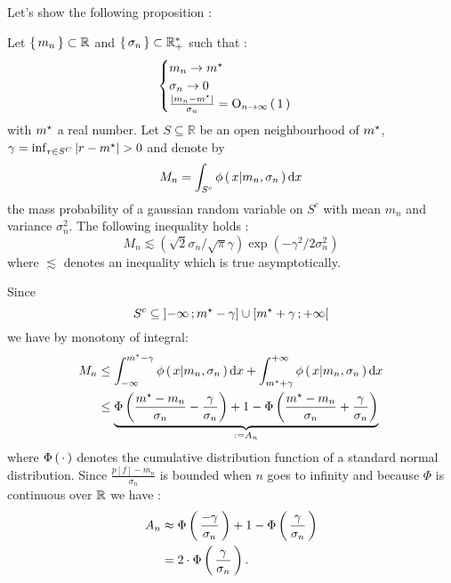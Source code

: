 Let's show the following proposition :
\begin{boxtheorem}
Let $\left \{ \, m_n \, \right \}\subset \mathbb{R}$ and $\left \{ \, \sigma_n \, \right \}\subset\mathbb{R}_{+}^{*}$ such that :
\begin{equation*}
  \begin{cases}
    m_n \rightarrow \mopt\\
    \sigma_n \rightarrow 0  \\
    \frac{\abs{m_n-\mopt}}{\sigma_n} = \O_{n\rightarrow \infty}\prt{1}
\end{cases}
\end{equation*}
with $\mopt$ a real number. Let $S \subseteq \mathbb { R }$ be an open neighbourhood of
$\mopt$, $\gamma = \inf _ { r \in S ^ { C } } | r - \mopt | > 0$ and denote by
\begin{equation*}
  M_n = \int_{S^c} \phi\left( \, x |m_n, \sigma_n \, \right) \mathop{}\mathopen{}\mathrm{d}{}x
\end{equation*}
the mass probability of a gaussian random variable on $S^c$ with mean $m_n$ and  variance $\sigma_n^2$. The following inequality holds :
 \begin{equation}
M_n \lesssim \left( \sqrt { 2 } \sigma _ { n } / \sqrt { \pi } \gamma \right) \exp \left( - \gamma ^ { 2 } / 2 \sigma _ { n } ^ { 2 } \right)
 \end{equation}
 where $\lesssim$ denotes an inequality which is true asymptotically.
\end{boxtheorem}

\noindent
Since $$S^c \subseteq \intof{-\infty}{\mopt-\gamma} \cup \intfo{\mopt+\gamma}{+\infty}$$
we have by monotony of integral:
\begin{align*}
  M_n &\leq \int_{-\infty}^{\mopt-\gamma}\phi\prt{x |m_n, \sigma_n} \dx
  + \int_{\mopt+\gamma}^{+\infty}\phi\prt{x |m_n, \sigma_n} \dx\\
  &\leq \underbrace{\Phi \left( \frac { \mopt - m _ { n } } { \sigma _ { n } } - \frac { \gamma } { \sigma _ { n } } \right)+ 1-\Phi \left( \frac { \mopt - m _ { n } } { \sigma _ { n } } + \frac { \gamma } { \sigma _ { n } } \right)}_{:=A_n}
\end{align*}
where $\Phi\left( \, \cdot \, \right)$ denotes the cumulative distribution function of a standard normal distribution. Since $\frac { p [ f ] - m _ { n } } { \sigma _ { n }}$ is bounded
 when $n$ goes to infinity and because $\Phi$ is continuous over $\mathbb{R}$ we have :
\begin{align*}
  A_n &\approx \Phi\left( \, \frac{-\gamma}{\sigma_n} \, \right)+1-\Phi\left( \, \frac{\gamma}{\sigma_n} \, \right)\\
  &= 2\cdot \Phi\left( \, \frac{\gamma}{\sigma_n} \, \right).
\end{align*}

